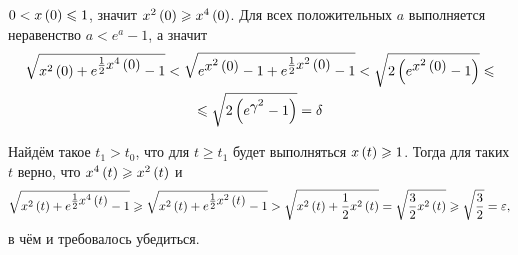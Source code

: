 \documentclass[a5paper,10pt]{article}
\begin{document}
$0 < x\left(0\right) \leqslant 1$, значит $x^2\left(0\right) \geqslant x^{4}\left(0\right)$. Для всех положительных $a$ выполняется неравенство $a < e^{a} - 1$, а значит
\begin{multline*}
\sqrt{x^2\br{0} + \tpow{e}{\frac {1}{2} x^4\br{0}} - 1} 
< \sqrt{\tpow{e}{x^2\br{0}} - 1 + \tpow{e}{\frac {1}{2} x^2\br{0}} - 1} 
< \sqrt{2\br{\tpow{e}{x^2\br{0}} - 1}} \le \\
\le \sqrt{2\br{\tpow{e}{\gamma^2} - 1}} = \delta 
\end{multline*}

Найдём такое $t_{1} > t_{0}$, что для $t \ge t_{1}$ будет выполняться $x\left(t\right) \geqslant 1$. Тогда для таких $t$ верно, что $x^4\left(t\right) \geqslant x^2\left(t\right)$ и
$$
\sqrt{x^2\br{t} + \tpow{e}{\frac {1}{2} x^4\br{t}} - 1} 
\ge \sqrt{x^2\br{t} + \tpow{e}{\frac {1}{2} x^2\br{t}} - 1} 
> \sqrt{x^2\br{t} + \dfrac {1} {2} x^2\br{t}} 
= \sqrt{\dfrac {3} {2} x^2\br{t}} 
\ge \sqrt{ \dfrac {3} {2} } = \epsilon,
$$
в чём и требовалось убедиться. 
\end{document}
